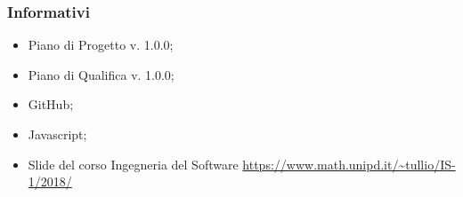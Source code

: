     \subsubsection{Informativi}
	    \begin{itemize}
	        \item Piano di Progetto v. 1.0.0;
	        \item Piano di Qualifica v. 1.0.0;
	        \item GitHub\pedice;
	        \item Javascript\pedice;
            \item Slide del corso Ingegneria del Software \newline
            \url{https://www.math.unipd.it/~tullio/IS-1/2018/}
	    \end{itemize}
